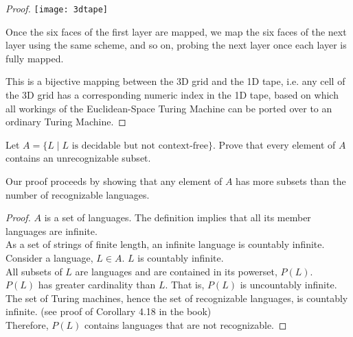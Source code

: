\documentclass[addpoints,a4paper]{exam}
\begin{document}
\begin{questions}
\begin{solution}
\begin{proof}
    \texttt{[image: 3dtape]}

    Once the six faces of the first layer are mapped, we map the six faces of the next layer using the same scheme,  and so on, probing the next layer once each layer is fully mapped.
    
This is a bijective mapping between the 3D grid and the 1D tape, i.e. any cell of the 3D grid has a corresponding numeric index in the 1D tape, based on which all workings of the Euclidean-Space Turing Machine can be ported over to an ordinary Turing Machine.
\end{proof}
\end{solution}
  
\question [10] Let $A = \{L \mid L\text{ is decidable but not context-free}\}$. Prove that every element of $A$ contains an unrecognizable subset.

  \begin{solution}
    Our proof proceeds by showing that any element of $A$ has more subsets than the number of recognizable languages.
    \begin{proof}
      $A$ is a set of languages. The definition implies that all its member languages are infinite.\\
      As a set of strings of finite length, an infinite language is countably infinite.\\
      Consider a language, $L\in A$. $L$ is countably infinite.\\
      All subsets of $L$ are languages and are contained in its powerset, $P(L)$.\\
      $P(L)$ has greater cardinality than $L$. That is, $P(L)$ is uncountably infinite.\\
      The set of Turing machines, hence the set of recognizable languages, is countably infinite. (see proof of Corollary 4.18 in the book)\\
      Therefore, $P(L)$ contains languages that are not recognizable.
    \end{proof}
  \end{solution}
\end{questions}
\end{document}
